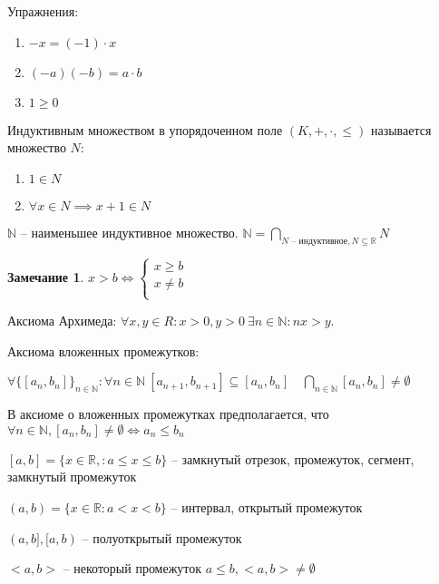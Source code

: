 \documentclass{book}
\newcommand\N{\ensuremath{\mathbb{N}}}
\newcommand\R{\ensuremath{\mathbb{R}}}
\renewcommand\O{\ensuremath{\emptyset}}
\theoremstyle{definition}
\newtheorem*{note}{Замечание}
\begin{document}
        Упражнения:
        \begin{enumerate}
            \item $-x = (-1)\cdot x$
            \item $(-a)(-b) = a\cdot b$
            \item $1\geqslant 0$
        \end{enumerate}
        \begin{definition}
            Индуктивным множеством в упорядоченном поле $(K, +, \cdot , \leqslant )$ называется множество $N$:
           \begin{enumerate}
               \item $1\in N$
               \item $\forall x\in N \implies  x+1\in N$
           \end{enumerate}

           $\N $ -- наименьшее индуктивное множество. $\N  = \bigcap\limits_{N\text{ -- индуктивное}, N\subseteq \R}N $
        \end{definition}
        \begin{note}
            $x>b \iff \begin{cases}
                x\geqslant b\\
                x\neq b\\
            \end{cases}$
        \end{note}
        Аксиома Архимеда: $\forall x, y\in R: x>0, y>0\ \exists  n\in \N : nx>y$.

        Аксиома вложенных промежутков: 
        
        $\forall \{[a_n, b_n]\}_{n\in \N }: \forall n\in \N\ [a_{n+1}, b_{n+1}] \subseteq [a_n, b_n]\quad \bigcap\limits_{n\in \N } [a_n, b_n]\neq \O  $

        В аксиоме о вложенных промежутках предполагается, что\\
        $\forall  n\in \N , [a_n, b_n] \neq \O  \iff  a_n \leqslant  b_n$

        $[a,b] = \{x\in \R,: a\leqslant x\leqslant b\}$ -- замкнутый отрезок, промежуток, сегмент, замкнутый промежуток

        $(a,b) = \{x\in \R: a<x<b\}$ -- интервал, открытый промежуток

        $(a,b], [a,b)$ -- полуоткрытый промежуток

        $<a,b>$ -- некоторый промежуток $a\leqslant b, <a,b> \neq \O $
\end{document}
